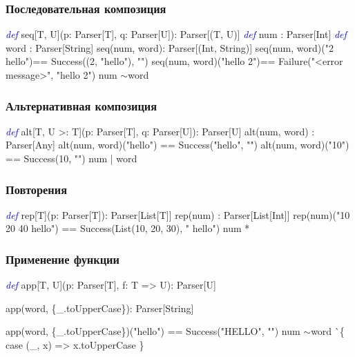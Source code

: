 \documentclass{beamer}
\newcommand{\mytilde}{$\sim$}
\newcommand{\keyword}[1]{\textcolor{blue}{\textsl{#1}}}
\begin{document}
\begin{frame}[fragile]
  \frametitle{Последовательная композиция}
  \begin{semiverbatim}
\keyword{def} seq[T, U](p: Parser[T], q: Parser[U]): Parser[(T, U)]
\pause
\keyword{def} num : Parser[Int]
\keyword{def} word : Parser[String]
\pause
seq(num, word)\pause : Parser[(Int, String)]
\pause
seq(num, word)("2 hello")\pause == Success((2, "hello"), "")
\pause
seq(num, word)("hello 2")\pause == Failure("<error message>",
                                     "hello 2")
\pause
num \mytilde word
  \end{semiverbatim}
\end{frame}

\begin{frame}[fragile]
  \frametitle{Альтернативная композиция}
  \begin{semiverbatim}
\keyword{def} alt[T, U >: T](p: Parser[T], q: Parser[U]): Parser[U]
\pause
alt(num, word) : Parser[Any]
\pause
alt(num, word)("hello") == Success("hello", "")
alt(num, word)("10") == Success(10, "")
\pause
num | word
  \end{semiverbatim}
\end{frame}

\begin{frame}[fragile]
  \frametitle{Повторения}
  \begin{semiverbatim}
\keyword{def} rep[T](p: Parser[T]): Parser[List[T]]
\pause
rep(num) : Parser[List[Int]]
\pause
rep(num)("10 20 40 hello") == Success(List(10, 20, 30),
                                      " hello")
\pause
num *
  \end{semiverbatim}
\end{frame}

\begin{frame}[fragile]
  \frametitle{Применение функции}
  \begin{semiverbatim}
\keyword{def} app[T, U](p: Parser[T], f: T => U): Parser[U]\pause

app(word, \{_.toUpperCase\})\pause : Parser[String]\pause

app(word, \{_.toUpperCase\})("hello") == Success("HELLO",
                                               "")
\pause
num \mytilde word ^^ \{
  case (_, x) => x.toUpperCase
\}
  \end{semiverbatim}
\end{frame}
\end{document}
